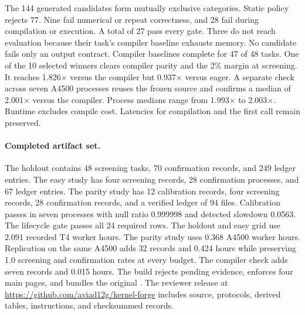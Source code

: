 The 144 generated candidates form mutually exclusive categories. Static policy
rejects 77. Nine fail numerical or repeat correctness, and 28 fail during
compilation or execution. A total of 27 pass every gate. Three do not reach
evaluation because their task's compiler baseline exhausts memory. No candidate
fails only an output contract. Compiler baselines complete for 47 of 48 tasks.
One of the 10 selected winners clears compiler parity and the 2\% margin at
screening. It reaches 1.826$\times$ versus the compiler but 0.937$\times$ versus
eager. A separate check across seven A4500 processes reuses the frozen source and
confirms a median of 2.001$\times$ versus the compiler. Process medians range from
1.993$\times$ to 2.003$\times$. Runtime excludes compile cost. Latencies for
compilation and the first call remain preserved.

\paragraph{Completed artifact set.}

The holdout contains 48 screening tasks, 70 confirmation records, and 249 ledger
entries. The easy study has four screening records, 28 confirmation processes,
and 67 ledger entries. The parity study has 12 calibration records, four
screening records, 28 confirmation records, and a verified ledger of 94 files.
Calibration passes in seven processes with null ratio 0.999998 and detected
slowdown 0.0563. The lifecycle gate passes all 24 required rows. The holdout and
easy grid use 2.091 recorded T4 worker hours. The parity study uses 0.368 A4500
worker hours. Replication on the same A4500 adds 32 records and 0.424 hours while
preserving 1.0 screening and confirmation rates at every budget. The compiler
check adds seven records and 0.015 hours. The build rejects pending evidence,
enforces four main pages, and bundles the original .
The reviewer release at \url{https://github.com/aviad12g/kernel-forge} includes
source, protocols, derived tables, instructions, and checksummed records.
